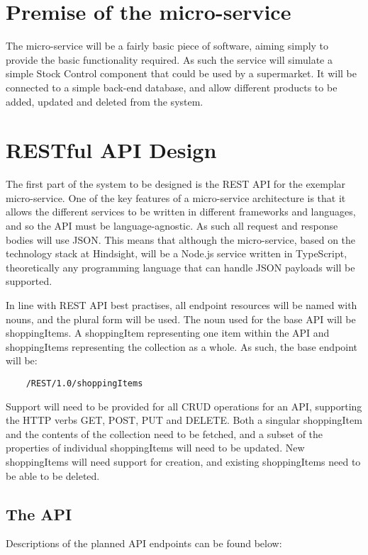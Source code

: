 \section{Premise of the micro-service}
The micro-service will be a fairly basic piece of software, aiming simply to provide the basic functionality required. As such the service will simulate a simple Stock Control component that could be used by a supermarket. It will be connected to a simple back-end database, and allow different products to be added, updated and deleted from the system. 

\section{RESTful API Design}
The first part of the system to be designed is the REST API for the exemplar micro-service. One of the key features of a micro-service architecture is that it allows the different services to be written in different frameworks and languages, and so the API must be language-agnostic. As such all request and response bodies will use JSON. This means that although the micro-service, based on the technology stack at Hindsight, will be a Node.js service written in TypeScript, theoretically any programming language that can handle JSON payloads will be supported.

In line with REST API best practises, all endpoint resources will be named with nouns, and the plural form will be used. The noun used for the base API will be shoppingItems. A shoppingItem representing one item within the API and shoppingItems representing the collection as a whole. 
As such, the base endpoint will be:
\begin{verbatim}
    /REST/1.0/shoppingItems
\end{verbatim}

Support will need to be provided for all CRUD operations for an API, supporting the HTTP verbs GET, POST, PUT and DELETE. Both a singular shoppingItem and the contents of the collection need to be fetched, and a subset of the properties of individual shoppingItems will need to be updated. New shoppingItems will need support for creation, and existing shoppingItems need to be able to be deleted.

\subsection{The API}
Descriptions of the planned API endpoints can be found below:

